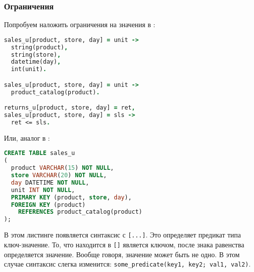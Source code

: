 \subsubsection{Ограничения}
\label{sec:technology:logiql:constraints}

Попробуем наложить ограничения на значения в \logiql:

\begin{lstlisting}[language=Prolog]
sales_u[product, store, day] = unit ->
  string(product),
  string(store),
  datetime(day),
  int(unit).

sales_u[product, store, day] = unit ->
  product_catalog(product).

returns_u[product, store, day] = ret,
sales_u[product, store, day] = sls ->
  ret <= sls.
\end{lstlisting}

Или, аналог в \sql:

\begin{lstlisting}[language=SQL]
CREATE TABLE sales_u
(
  product VARCHAR(15) NOT NULL,
  store VARCHAR(20) NOT NULL,
  day DATETIME NOT NULL,
  unit INT NOT NULL,
  PRIMARY KEY (product, store, day),
  FOREIGN KEY (product)
    REFERENCES product_catalog(product)
);
\end{lstlisting}

В этом листинге появляется синтаксис с \lstinline{[...]}. Это определяет предикат типа ключ-значение. То, что находится в \lstinline{[]} является ключом, после знака равенства определяется значение. Вообще говоря, значение может быть не одно. В этом случае синтаксис слегка изменится: \lstinline{some_predicate(key1, key2; val1, val2)}.

